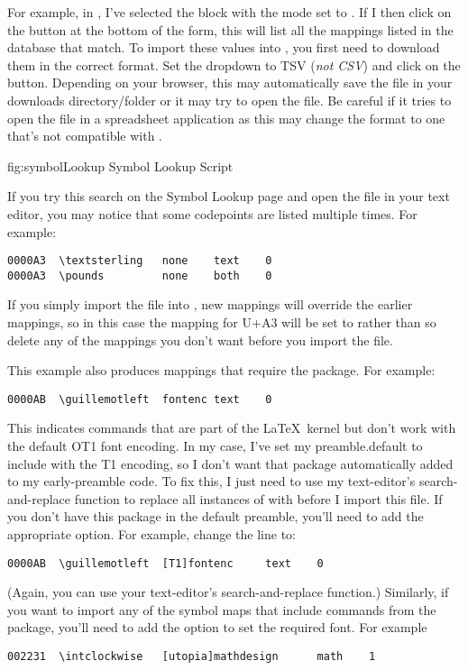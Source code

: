 For example, in , I've selected the
 block with the mode set to . If I
then click on the  button at the bottom of the form, this
will list all the mappings listed in the database that match. To
import these values into \FlowframTk, you first need to download
them in the correct format. Set the 
\gls{dropdown} to TSV (\emph{not CSV}) and click on the
 button. Depending on your browser, this may
automatically save the file  in your
downloads directory\slash folder or it may try to open the file.
Be careful if it tries to open the file in a spreadsheet application
as this may change the format to one that's not compatible with
\FlowframTk.

\FloatFig
  {fig:symbolLookup}
  {}
  {Symbol Lookup Script}

If you try this search on the Symbol Lookup page and open the file in your
 text editor, you may notice that some codepoints are listed
multiple times. For example:
\begin{verbatim}
0000A3  \textsterling   none    text    0
0000A3  \pounds         none    both    0
\end{verbatim}
If you simply import the file into \FlowframTk, new mappings will
override the earlier mappings, so in this case the mapping for
U+A3 will be set to  rather than
 so delete any of the mappings you don't want
before you import the file.

This example also produces mappings that require the 
package. For example:
\begin{verbatim}
0000AB  \guillemotleft  fontenc text    0
\end{verbatim}
This indicates commands that are part of the \LaTeX\ kernel but don't
work with the default OT1 font encoding. In my case, I've set my
\gls{preamble.default} to include
 with the T1 encoding, so I don't want that package
automatically added to my early-preamble code. To fix this, I just need to
use my text-editor's search-and-replace function to replace all instances of
 with  before I import this file. If you don't
have this package in the default preamble, you'll need to add the appropriate
option.  For example, change the line to:
\begin{verbatim}
0000AB  \guillemotleft  [T1]fontenc     text    0
\end{verbatim}
(Again, you can use your text-editor's search-and-replace function.)
Similarly, if you want to import any of the symbol maps that include
commands from the  package, you'll need to add
the option to set the required font. For example
\begin{verbatim}
002231  \intclockwise   [utopia]mathdesign      math    1
\end{verbatim}

